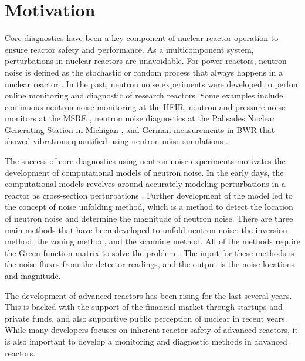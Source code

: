 \label{ch:introduction}

\section{Motivation}

Core diagnostics have been a key component of nuclear reactor operation to ensure reactor safety and performance. As a multicomponent system, perturbations in nuclear reactors are unavoidable. For power reactors, neutron noise is defined as the stochastic or random process that always happens in a nuclear reactor \cite{saitoTheoryPowerReactor1974b}. In the past, neutron noise experiments were developed to perfom online monitoring and diagnostic of research reactors. Some examples include continuous neutron noise monitoring at the \gls*{HFIR}, neutron and pressure noise monitors at the \gls*{MSRE} \cite{fryExperienceReactorMalfunction1971}, neutron noise diagnostics at the Palisades Nuclear Generating Station in Michigan \cite{fryAnalysisNeutrondensityOscillations1975}, and German measurements in \gls*{BWR} that showed vibrations quantified using neutron noise simulations \cite{wachInvestigationJointEffect1974}. 

The success of core diagnostics using neutron noise experiments motivates the development of computational models of neutron noise. In the early days, the computational models revolves around accurately modeling perturbations in a reactor as cross-section perturbations \cite{saitoTheoryPowerReactor1974,saitoTheoryPowerReactor1974a}. Further development of the model led to the concept of noise unfolding method, which is a method to detect the location of neutron noise and determine the magnitude of neutron noise. There are three main methods that have been developed to unfold neutron noise: the inversion method, the zoning method, and the scanning method. All of the methods require the Green function matrix to solve the problem \cite{pazsitNoiseTechniquesNuclear2010}. The input for these methods is the noise fluxes from the detector readings, and the output is the noise locations and magnitude.

The development of advanced reactors has been rising for the last several years. This is backed with the support of the financial market through startups and private funds, and also supportive public perception of nuclear in recent years. While many developers focuses on inherent reactor safety of advanced reactors, it is also important to develop a monitoring and diagnostic methods in advanced reactors.

